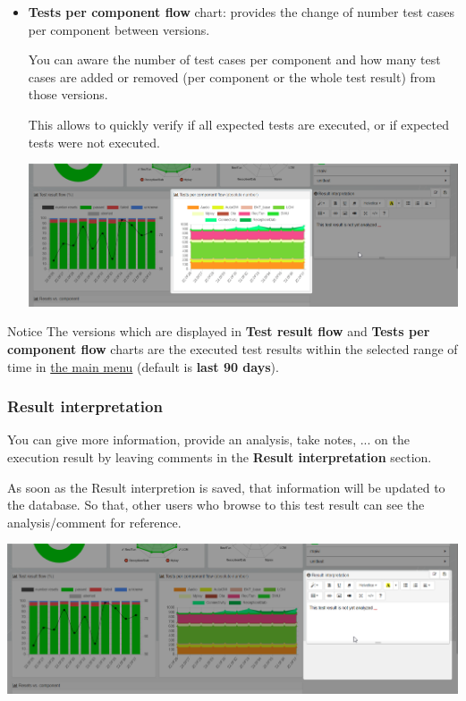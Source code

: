 \begin{itemize}
\item \textbf{Tests per component flow} chart: provides the change of number test
cases per component between versions.

You can aware the number of test cases per component and how many test cases are
added or removed (per component or the whole test result) from those versions.

This allows to quickly verify if all expected tests are executed, or if expected
tests were not executed.

\includegraphics[width=1\linewidth]
{./pictures/dashboard/chart_tests_per_component_flow.png}
\end{itemize}

\begin{boxhint}{Notice}
The versions which are displayed in \textbf{Test result flow} and 
\textbf{Tests per component flow} charts are the executed test results within 
the selected range of time in 
\hyperref[main-menu]{the main menu} (default is \textbf{last 90 days}).
\end{boxhint}


\subsubsection{Result interpretation}
You can give more information, provide an analysis, take notes, ... on the 
execution result by leaving comments in the \textbf{Result interpretation} 
section.

As soon as the Result interpretion is saved, that information will be updated to 
the database. So that, other users who browse to this test result can see
the analysis/comment for reference.

\includegraphics[width=1\linewidth]
{./pictures/dashboard/result_interpretation.png}

